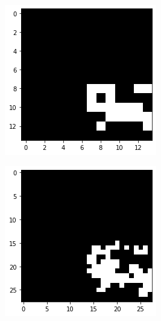 \documentclass[10pt,twocolumn,hidelinks,letterpaper]{article}
\begin{document}
\begin{figure}
\begin{subfigure}{.59\linewidth}
\begin{subfigure}{.325\linewidth}
  	\end{subfigure}
  	\begin{subfigure}{.325\linewidth}
  		\includegraphics[width=\linewidth]{images/mmaps_example/downsampling14x14_bw.png}
  	\end{subfigure}
  	\begin{subfigure}{.325\linewidth}
  		\includegraphics[width=\linewidth]{images/mmaps_example/downsampling28x28_bw.png}

\end{subfigure}
\end{subfigure}
\end{figure}
\end{document}
